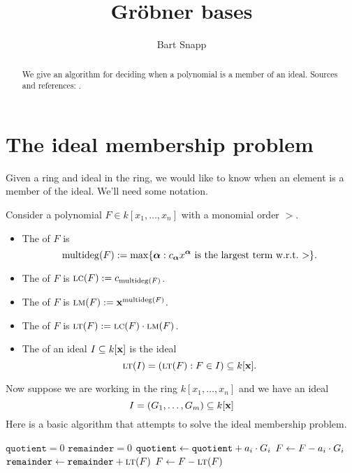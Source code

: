 \documentclass{ximera}
\title{Gr\"obner bases}
\author{Bart Snapp}
\begin{document}
\begin{abstract}
  We give an algorithm for deciding when a polynomial is a member of
  an ideal.  Sources and references: \cite{CLO2007,hS2003}.
\end{abstract}
\maketitle



\section{The ideal membership problem}

Given a ring and ideal in the ring, we would like to know when an
element is a member of the ideal. We'll need some notation.


\begin{definition}
  Consider a polynomial $F\in k[x_1,\dots, x_n]$ with a monomial order
  $>$.
  \begin{itemize}
    \item The  of $F$ is
    \[
    \operatorname{multideg}(F) := \max\{{\boldsymbol\alpha}: \text{$c_{\boldsymbol\alpha} x^{\boldsymbol\alpha}$ is the largest term w.r.t.\ $>$} \}.
    \]
  \item The  of $F$ is $\textsc{lc}(F) := c_{\operatorname{multideg}(F)}$.
  \item The  of $F$ is $\textsc{lm}(F) := \mathbf{x}^{\operatorname{multideg}(F)}$.
  \item The  of $F$ is $\textsc{lt}(F) := \textsc{lc}(F)\cdot \textsc{lm}(F)$.
  \item The  of an ideal $I\subseteq k[\mathbf{x}]$ is
    the ideal
    \[
    \textsc{lt}(I) = (\textsc{lt}(F): F\in I)\subseteq k[\mathbf{x}].
    \]
  \end{itemize}
\end{definition}

Now suppose we are working in the ring $k[x_1,\dots, x_n]$ and we have an ideal
\[
I = (G_1,\dots, G_m) \subseteq k[\mathbf{x}]
\]
Here is a basic algorithm that attempts to solve the ideal membership
problem.

\begin{algorithm}
  \hfill
  \begin{algorithmic}[1]
    \State $\texttt{quotient} = 0$
    \State $\texttt{remainder} = 0$
    \Repeat
    \State $\texttt{quotient} \leftarrow \texttt{quotient} + a_i\cdot G_i$
    \State $F \leftarrow F - a_i\cdot G_i$
    \Else
    \State $\texttt{remainder} \leftarrow \texttt{remainder} + \textsc{lt}(F)$
    \State $F\leftarrow F- \textsc{lt}(F)$
    \EndIf
  \end{algorithmic}
\end{algorithm}
\end{document}
